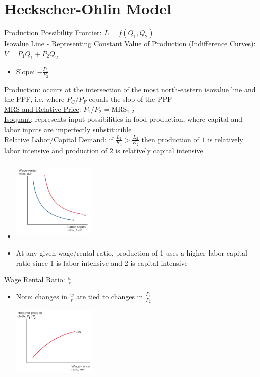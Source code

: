 \documentclass{article}
\begin{document}
\section{Heckscher-Ohlin Model}
\underline{Production Possibility Frontier}: $L = f(Q_{1}, Q_{2})$ \\
\underline{Isovalue Line - Representing Constant Value of Production (Indifference Curves)}: $V = P_{1}Q_{1} + P_{2}Q_{2}$
\begin{itemize}
  \item  \underline{Slope}: $-\tfrac{P_{1}}{P_{2}}$
\end{itemize}
\underline{Production}: occurs at the intersection of the most north-eastern isovalue line and the PPF, i.e. where $P_{C}/P_{F}$ equals the slop of the PPF  \\
\underline{MRS and Relative Price}: $P_{1}/P_{2} = \text{MRS}_{1,2}$ \\
\underline{Isoquant}: represents input possibilities in food production, where capital and labor inputs are imperfectly substitutible  \\
\underline{Relative Labor/Capital Demand}: if $\tfrac{L_{1}}{K_{1}} >  \tfrac{L_{2}}{K_{2}}$ then production of $1$ is relatively labor intensive and production of $2$ is relatively capital intensive
\begin{itemize}
  \item  \includegraphics[width=4cm, height=4cm]{pic1}
  \item  At any given wage/rental-ratio, production of 1 uses a higher labor-capital ratio since 1 is labor intensive and 2 is capital intensive
\end{itemize}
\underline{Wage Rental Ratio}: $\tfrac{w}{r}$
\begin{itemize}
  \item  \underline{Note}: changes in $\tfrac{w}{r}$ are tied to changes in $\tfrac{P_{1}}{P_{2}}$  \\
  \includegraphics[width=4cm, height=4cm]{pic2}
\end{itemize}
\end{document}
